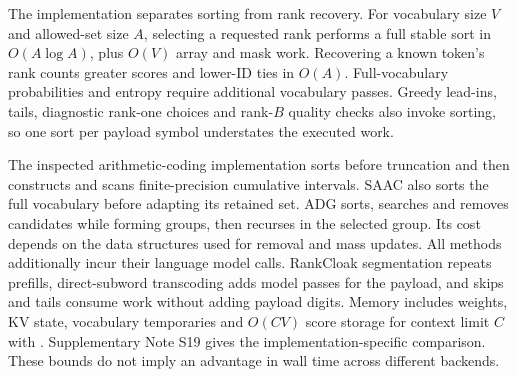 The implementation separates sorting from rank recovery. For vocabulary size \(V\) and allowed-set size \(A\), selecting a requested rank performs a full stable sort in \(O(A\log A)\), plus \(O(V)\) array and mask work. Recovering a known token's rank counts greater scores and lower-ID ties in \(O(A)\). Full-vocabulary probabilities and entropy require additional vocabulary passes. Greedy lead-ins, tails, diagnostic rank-one choices and rank-\(B\) quality checks also invoke sorting, so one sort per payload symbol understates the executed work.

The inspected arithmetic-coding implementation sorts before truncation and then constructs and scans finite-precision cumulative intervals\cite{Ziegler2019NeuralLinguisticSteganography}. SAAC also sorts the full vocabulary before adapting its retained set\cite{Shen2020SelfAdjustingArithmetic}. ADG sorts, searches and removes candidates while forming groups, then recurses in the selected group\cite{Zhang2021ProvablySecureGenerative}. Its cost depends on the data structures used for removal and mass updates. All methods additionally incur their language model calls. RankCloak segmentation repeats prefills, direct-subword transcoding adds model passes for the payload, and skips and tails consume work without adding payload digits. Memory includes weights, KV state, vocabulary temporaries and \(O(CV)\) score storage for context limit \(C\) with . Supplementary Note S19 gives the implementation-specific comparison. These bounds do not imply an advantage in wall time across different backends.
